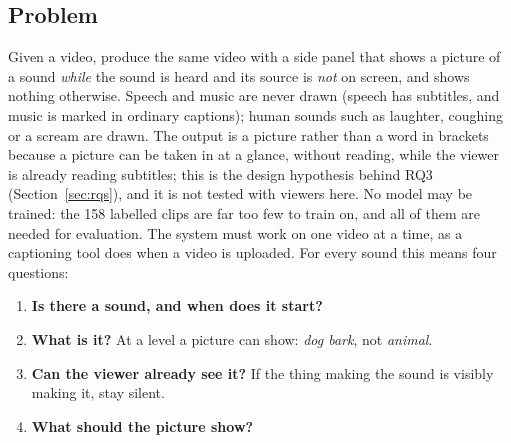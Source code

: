 \subsection{Problem}\label{sec:problem}
Given a video, produce the same video with a side panel that shows a picture of a sound \emph{while} the sound is
heard and its source is \emph{not} on screen, and shows nothing otherwise. Speech and music are never drawn (speech has
subtitles, and music is marked in ordinary captions); human sounds such as laughter, coughing or a scream are drawn.
The output is a picture rather than a word in brackets because a picture can be taken in at a glance, without
reading, while the viewer is already reading subtitles; this is the design hypothesis behind RQ3
(Section~\ref{sec:rqs}), and it is not tested with viewers here. No model may be trained: the 158 labelled clips are
far too few to train on, and all of them are needed for evaluation. The system must work on one video at a time, as a
captioning tool does when a video is uploaded. For every sound this means four questions:
\begin{enumerate}
  \item \textbf{Is there a sound, and when does it start?}
  \item \textbf{What is it?} At a level a picture can show: \emph{dog bark}, not \emph{animal}.
  \item \textbf{Can the viewer already see it?} If the thing making the sound is visibly making it, stay silent.
  \item \textbf{What should the picture show?}
\end{enumerate}

